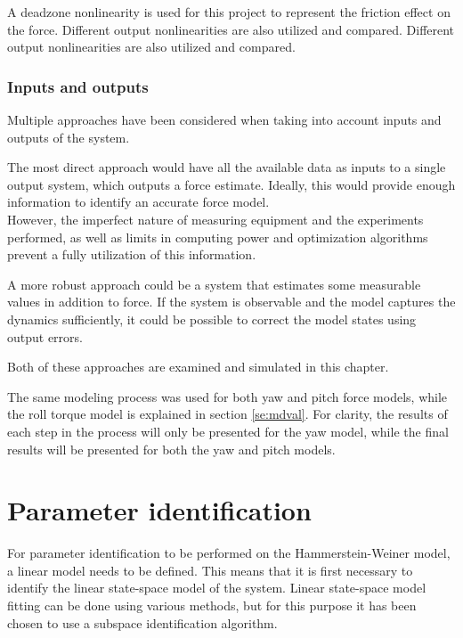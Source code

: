A deadzone nonlinearity is used for this project to represent the friction effect on the force.
Different output nonlinearities are also utilized and compared.
Different output nonlinearities are also utilized and compared.

\subsubsection{Inputs and outputs}
Multiple approaches have been considered when taking into account inputs and outputs of the system.

The most direct approach would have all the available data as inputs to a single output system, which outputs a force estimate.
Ideally, this would provide enough information to identify an accurate force model.\\
However, the imperfect nature of measuring equipment and the experiments performed, as well as limits in computing power and optimization algorithms prevent a fully utilization of this information.

A more robust approach could be a system that estimates some measurable values in addition to force.
If the system is observable and the model captures the dynamics sufficiently, it could be possible to correct the model states using output errors.

Both of these approaches are examined and simulated in this chapter.

The same modeling process was used for both yaw and pitch force models, while the roll torque model is explained in section \ref{se:mdval}.
For clarity, the results of each step in the process will only be presented for the yaw model, while the final results will be presented for both the yaw and pitch models. 

\section{Parameter identification}\label{sec:para_iden}

For parameter identification to be performed on the Hammerstein-Weiner model, a linear model needs to be defined.
This means that it is first necessary to identify the linear state-space model of the system.
Linear state-space model fitting can be done using various methods, but for this purpose it has been chosen to use a subspace identification algorithm.

